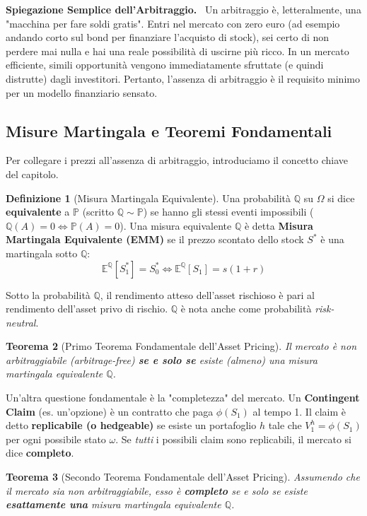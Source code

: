 \documentclass[11pt, a4paper]{report}
\theoremstyle{plain}
\newtheorem{theorem}{Teorema}[chapter]
\theoremstyle{definition}
\newtheorem{definition}[theorem]{Definizione}
\theoremstyle{remark}
\newenvironment{hint}[1][Hint]
{\begin{mdframed}[backgroundcolor=blue!5, linecolor=blue!50, linewidth=2pt, topline=false, rightline=false, bottomline=false]
\textbf{\textsf{#1.}}\ }
{\end{mdframed}}
\newcommand{\PP}{\mathbb{P}}
\newcommand{\E}{\mathbb{E}}
\newcommand{\QQ}{\mathbb{Q}}
\newcommand{\1}{\mathbf{1}}
\begin{document}
\begin{hint}[Spiegazione Semplice dell'Arbitraggio]
Un arbitraggio è, letteralmente, una "macchina per fare soldi gratis". Entri nel mercato con zero euro (ad esempio andando corto sul bond per finanziare l'acquisto di stock), sei certo di non perdere mai nulla e hai una reale possibilità di uscirne più ricco. In un mercato efficiente, simili opportunità vengono immediatamente sfruttate (e quindi distrutte) dagli investitori. Pertanto, l'assenza di arbitraggio è il requisito minimo per un modello finanziario sensato.
\end{hint}

\subsection{Misure Martingala e Teoremi Fondamentali}

Per collegare i prezzi all'assenza di arbitraggio, introduciamo il concetto chiave del capitolo.

\begin{definition}[Misura Martingala Equivalente]
Una probabilità $\QQ$ su $\Omega$ si dice \textbf{equivalente} a $\PP$ (scritto $\QQ \sim \PP$) se hanno gli stessi eventi impossibili ($\QQ(A)=0 \iff \PP(A)=0$).
Una misura equivalente $\QQ$ è detta \textbf{Misura Martingala Equivalente (EMM)} se il prezzo scontato dello stock $S^*$ è una martingala sotto $\QQ$:
\[ \E^\QQ[S^*_1] = S^*_0 \iff \E^\QQ[S_1] = s(1+r) \]
\end{definition}

Sotto la probabilità $\QQ$, il rendimento atteso dell'asset rischioso è pari al rendimento dell'asset privo di rischio. $\QQ$ è nota anche come probabilità \emph{risk-neutral}.

\begin{theorem}[Primo Teorema Fondamentale dell'Asset Pricing]
Il mercato è non arbitraggiabile (arbitrage-free) \textbf{se e solo se} esiste (almeno) una misura martingala equivalente $\QQ$.
\end{theorem}

Un'altra questione fondamentale è la "completezza" del mercato. Un \textbf{Contingent Claim} (es. un'opzione) è un contratto che paga $\phi(S_1)$ al tempo 1. Il claim è detto \textbf{replicabile (o hedgeable)} se esiste un portafoglio $h$ tale che $V_1^h = \phi(S_1)$ per ogni possibile stato $\omega$. 
Se \emph{tutti} i possibili claim sono replicabili, il mercato si dice \textbf{completo}.

\begin{theorem}[Secondo Teorema Fondamentale dell'Asset Pricing]
Assumendo che il mercato sia non arbitraggiabile, esso è \textbf{completo} se e solo se esiste \textbf{esattamente una} misura martingala equivalente $\QQ$.
\end{theorem}
\end{document}
